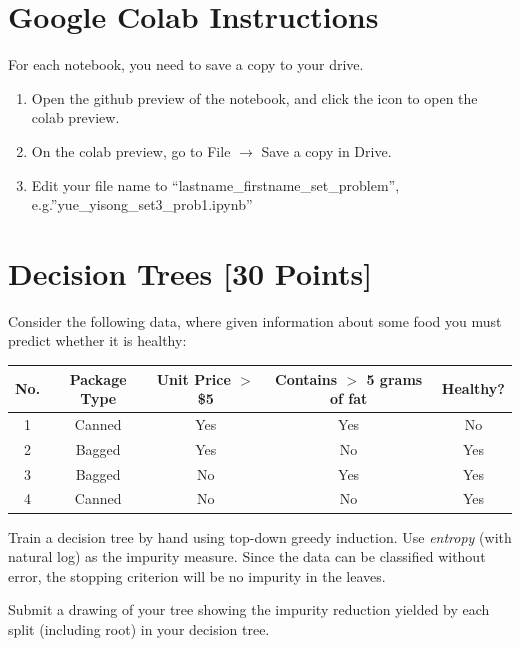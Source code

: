 \documentclass{article}
\begin{document}
\section*{Google Colab Instructions}
For each notebook, you need to save a copy to your drive.
\begin{enumerate}
        \item Open the github preview of the notebook, and click the icon to open the colab preview.
        \item On the colab preview, go to File $\rightarrow$ Save a copy in Drive.
        \item Edit your file name to “lastname_firstname_set_problem”, e.g.”yue_yisong_set3_prob1.ipynb”
\end{enumerate}




\newpage
\section{Decision Trees [30 Points]}

\problem[7]
Consider the following data, where given information about some food you must predict whether it is healthy:

\begin{table}[ht]
\centering
\begin{tabular}{c | c c c | c}
\hline
No. & Package Type & Unit Price $>$ \$5 & Contains $>$ 5 grams of fat & Healthy? \\ [0.5ex]
\hline
1 & Canned & Yes & Yes & No  \\
2 & Bagged & Yes & No  & Yes \\
3 & Bagged & No  & Yes & Yes \\
4 & Canned & No  & No  & Yes \\ [1ex]
\hline
\end{tabular}
\end{table}

Train a decision tree by hand using top-down greedy induction. Use \emph{entropy} (with natural log) as the impurity measure.  Since the data can be classified
without error, the stopping criterion will be no impurity in the leaves.

Submit a drawing of your tree showing the impurity reduction yielded by each split (including root) in your decision tree.

\begin{solution}

\end{solution}
\end{document}
